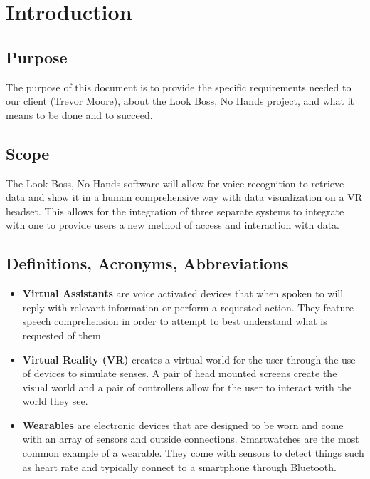 \documentclass[onecolumn, draftclsnofoot,10pt, compsoc]{IEEEtran}
\begin{document}
\begin{titlepage}
\begin{singlespace}
\begin{abstract}
        \end{abstract}
    \end{singlespace}
\end{titlepage}
\newpage
{}
\tableofcontents
\clearpage


\section{Introduction}
    \subsection{Purpose}
        The purpose of this document is to provide the specific requirements needed to our client (Trevor Moore), about the Look Boss, No Hands project, and what it means to be done and to succeed. 
    
    \subsection{Scope}
        The Look Boss, No Hands software will allow for voice recognition to retrieve data and show it in a human comprehensive way with data visualization on a VR headset. This allows for the integration of three separate systems to integrate with one to provide users a new method of access and interaction with data.
    
    \subsection{Definitions, Acronyms, Abbreviations}
    
        \begin{itemize}
            \item \textbf{Virtual Assistants} are voice activated devices that when spoken to will reply with relevant information or perform a requested action. They feature speech comprehension in order to attempt to best understand what is requested of them.\cite{def_ai}
            \item \textbf{Virtual Reality (VR)} creates a virtual world for the user through the use of devices to simulate senses. A pair of head mounted screens create the visual world and a pair of controllers allow for the user to interact with the world they see.\cite{def_vr}
            \item \textbf{Wearables} are electronic devices that are designed to be worn and come with an array of sensors and outside connections. Smartwatches are the most common example of a wearable. They come with sensors to detect things such as heart rate and typically connect to a smartphone through Bluetooth.\cite{def_wear}
        \end{itemize}
    
\end{document}
